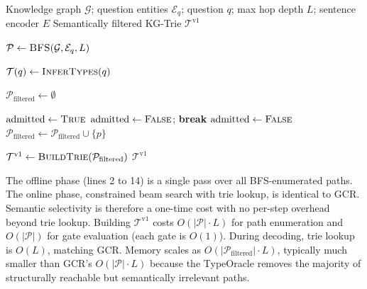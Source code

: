 \begin{algorithm}[htpb]
  \caption{DCA-Trie v1: Static Semantic Filtering}
  \label{alg:v1}
  \small
  \begin{algorithmic}[1]
    \Require Knowledge graph $\mathcal{G}$; question entities $\mathcal{E}_q$;
    question $q$; max hop depth $L$; sentence encoder $E$
    \Ensure Semantically filtered KG-Trie $\mathcal{T}^{\text{v1}}$

    \State $\mathcal{P} \gets \textsc{BFS}(\mathcal{G}, \mathcal{E}_q, L)$

    \State $\mathcal{T}(q) \gets \textsc{InferTypes}(q)$

    \State $\mathcal{P}_{\text{filtered}} \gets \emptyset$

    \State $\text{admitted} \gets \textsc{True}$
    \State $\text{admitted} \gets \textsc{False}$; \textbf{break}
    \EndIf
    \EndFor
    \State $\text{admitted} \gets \textsc{False}$
    \EndIf
    \EndIf
    \State $\mathcal{P}_{\text{filtered}} \gets \mathcal{P}_{\text{filtered}} \cup \{p\}$
    \EndIf
    \EndFor

    \State $\mathcal{T}^{\text{v1}} \gets \textsc{BuildTrie}(\mathcal{P}_{\text{filtered}})$
    \State \Return $\mathcal{T}^{\text{v1}}$
  \end{algorithmic}
\end{algorithm}

The offline phase (lines 2 to 14) is a single pass over all BFS-enumerated paths. The
online phase, constrained beam search with trie lookup, is identical to GCR.
Semantic selectivity is therefore a one-time cost with no per-step overhead beyond
trie lookup. Building $\mathcal{T}^{\text{v1}}$ costs $O(|\mathcal{P}| \cdot L)$ for
path enumeration and $O(|\mathcal{P}|)$ for gate evaluation (each gate is $O(1)$).
During decoding, trie lookup is $O(L)$, matching GCR. Memory scales as
$O(|\mathcal{P}_{\text{filtered}}| \cdot L)$, typically much smaller than GCR's
$O(|\mathcal{P}| \cdot L)$ because the TypeOracle removes the majority of structurally
reachable but semantically irrelevant paths.


